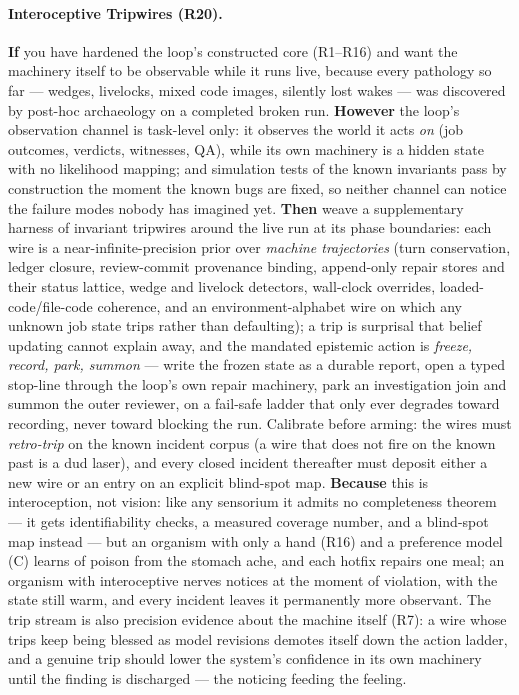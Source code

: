 \paragraph{Interoceptive Tripwires (R20).}\label{pat:r20} \textbf{If} you have hardened the loop's constructed core (R1--R16) and want the machinery itself to be observable while it runs live, because every pathology so far --- wedges, livelocks, mixed code images, silently lost wakes --- was discovered by post-hoc archaeology on a completed broken run. \textbf{However} the loop's observation channel is task-level only: it observes the world it acts \emph{on} (job outcomes, verdicts, witnesses, QA), while its own machinery is a hidden state with no likelihood mapping; and simulation tests of the known invariants pass by construction the moment the known bugs are fixed, so neither channel can notice the failure modes nobody has imagined yet. \textbf{Then} weave a supplementary harness of invariant tripwires around the live run at its phase boundaries: each wire is a near-infinite-precision prior over \emph{machine trajectories} (turn conservation, ledger closure, review-commit provenance binding, append-only repair stores and their status lattice, wedge and livelock detectors, wall-clock overrides, loaded-code/file-code coherence, and an environment-alphabet wire on which any unknown job state trips rather than defaulting); a trip is surprisal that belief updating cannot explain away, and the mandated epistemic action is \emph{freeze, record, park, summon} --- write the frozen state as a durable report, open a typed stop-line through the loop's own repair machinery, park an investigation join and summon the outer reviewer, on a fail-safe ladder that only ever degrades toward recording, never toward blocking the run. Calibrate before arming: the wires must \emph{retro-trip} on the known incident corpus (a wire that does not fire on the known past is a dud laser), and every closed incident thereafter must deposit either a new wire or an entry on an explicit blind-spot map. \textbf{Because} this is interoception, not vision: like any sensorium it admits no completeness theorem --- it gets identifiability checks, a measured coverage number, and a blind-spot map instead --- but an organism with only a hand (R16) and a preference model (C) learns of poison from the stomach ache, and each hotfix repairs one meal; an organism with interoceptive nerves notices at the moment of violation, with the state still warm, and every incident leaves it permanently more observant. The trip stream is also precision evidence about the machine itself (R7): a wire whose trips keep being blessed as model revisions demotes itself down the action ladder, and a genuine trip should lower the system's confidence in its own machinery until the finding is discharged --- the noticing feeding the feeling.

